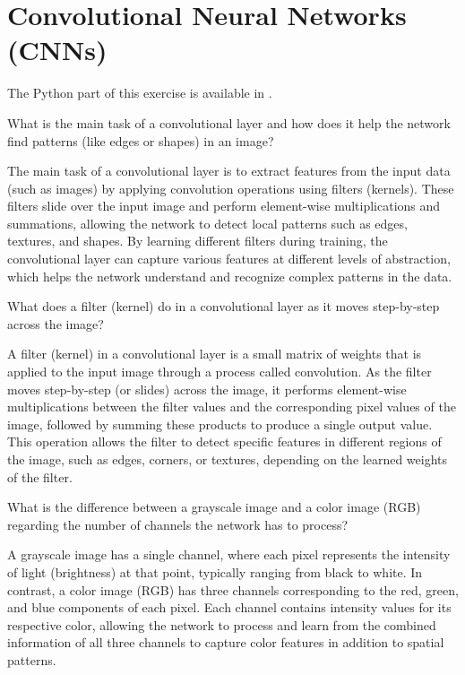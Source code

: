 \section{Convolutional Neural Networks (CNNs)}

The Python part of this exercise is available in .\\

\begin{ejercicio}
    What is the main task of a convolutional layer and how does it help the network find patterns (like edges or shapes) in an image?

    The main task of a convolutional layer is to extract features from the input data (such as images) by applying convolution operations using filters (kernels). These filters slide over the input image and perform element-wise multiplications and summations, allowing the network to detect local patterns such as edges, textures, and shapes. By learning different filters during training, the convolutional layer can capture various features at different levels of abstraction, which helps the network understand and recognize complex patterns in the data.
\end{ejercicio}

\begin{ejercicio}[Filter]
    What does a filter (kernel) do in a convolutional layer as it moves step-by-step across the image?

    A filter (kernel) in a convolutional layer is a small matrix of weights that is applied to the input image through a process called convolution. As the filter moves step-by-step (or slides) across the image, it performs element-wise multiplications between the filter values and the corresponding pixel values of the image, followed by summing these products to produce a single output value. This operation allows the filter to detect specific features in different regions of the image, such as edges, corners, or textures, depending on the learned weights of the filter.
\end{ejercicio}

\begin{ejercicio}
    What is the difference between a grayscale image and a color image (RGB) regarding the number of channels the network has to process?

    A grayscale image has a single channel, where each pixel represents the intensity of light (brightness) at that point, typically ranging from black to white. In contrast, a color image (RGB) has three channels corresponding to the red, green, and blue components of each pixel. Each channel contains intensity values for its respective color, allowing the network to process and learn from the combined information of all three channels to capture color features in addition to spatial patterns.
\end{ejercicio}

